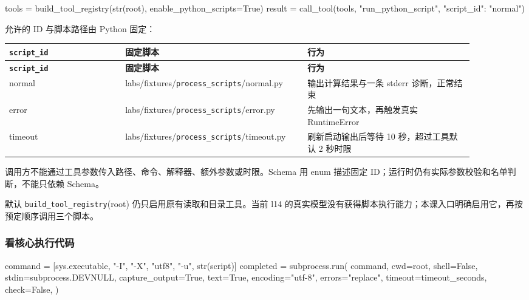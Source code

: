 \begin{Code}
tools = build_tool_registry(str(root), enable_python_scripts=True)
result = call_tool(tools, "run_python_script", {"script_id": "normal"})
\end{Code}

允许的 ID 与脚本路径由 Python 固定：

{\small\setlength{\tabcolsep}{4pt}
\renewcommand{\arraystretch}{1.25}
\begin{longtable}{>{\raggedright\arraybackslash}p{0.23\linewidth}>{\raggedright\arraybackslash}p{0.33\linewidth}>{\raggedright\arraybackslash}p{0.33\linewidth}}
\toprule
\textbf{\nolinkurl{script_id}} & \textbf{固定脚本} & \textbf{行为} \\
\midrule\endfirsthead
\toprule
\textbf{\nolinkurl{script_id}} & \textbf{固定脚本} & \textbf{行为} \\
\midrule\endhead
\bottomrule\endfoot
normal & labs/fixtures/\nolinkurl{process_scripts}/normal.py & 输出计算结果与一条 stderr 诊断，正常结束 \\
error & labs/fixtures/\nolinkurl{process_scripts}/error.py & 先输出一句文本，再触发真实 RuntimeError \\
timeout & labs/fixtures/\nolinkurl{process_scripts}/timeout.py & 刷新启动输出后等待 10 秒，超过工具默认 2 秒时限 \\
\end{longtable}}

调用方不能通过工具参数传入路径、命令、解释器、额外参数或时限。Schema 用 enum 描述固定 ID；运行时仍有实际参数校验和名单判断，不能只依赖 Schema。

默认 \nolinkurl{build_tool_registry}(root) 仍只启用原有读取和目录工具。当前 l14 的真实模型没有获得脚本执行能力；本课入口明确启用它，再按预定顺序调用三个脚本。

\subsubsection{看核心执行代码}

\begin{Code}
command = [sys.executable, "-I", "-X", "utf8", "-u", str(script)]
completed = subprocess.run(
    command,
    cwd=root,
    shell=False,
    stdin=subprocess.DEVNULL,
    capture_output=True,
    text=True,
    encoding="utf-8",
    errors="replace",
    timeout=timeout_seconds,
    check=False,
)
\end{Code}

